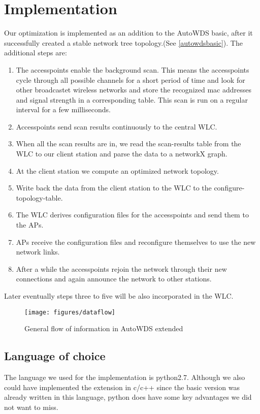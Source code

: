 \chapter{Implementation}
  Our optimization is implemented as an addition to the AutoWDS basic, after it successfully created a stable network tree topology.(See \ref{autowdsbasic}).
  The additional steps are:
  
  \begin{enumerate}
   \item The accesspoints enable the background scan. This means the accesspoints cycle through all possible channels for a short period of time
    and look for other broadcastet wireless networks and store the recognized mac addresses and signal strength in a corresponding table.
    This scan is run on a regular interval for a few milliseconds.
   \item Accesspoints send scan results continuously to the central \ac{WLC}.
   \item When all the scan results are in, we read the scan-results table from the \ac{WLC} to our client station and parse the data to a networkX graph.
   \item At the client station we compute an optimized network topology. 
   \item Write back the data from the client station to the WLC to the configure-topology-table.
   \item The \ac{WLC} derives configuration files for the accesspoints and send them to the APs.
   \item APs receive the configuration files and reconfigure themselves to use the new network links.
   \item After a while the accesspoints rejoin the network through their new connections and again announce the network to other stations.
  \end{enumerate}
  
  Later eventually steps three to five will be also incorporated in the \ac{WLC}.
  
  \begin{figure}[h!]
    \centering
    \texttt{[image: figures/dataflow]}
    \caption{General flow of information in AutoWDS extended}
    \label{fig:dataflow}
  \end{figure}

  \section{Language of choice}
    The language we used for the implementation is python2.7. Although we also could have implemented the extension in c/c++ since the basic version
    was already written in this language, python does have some key advantages we did not want to miss.
    
